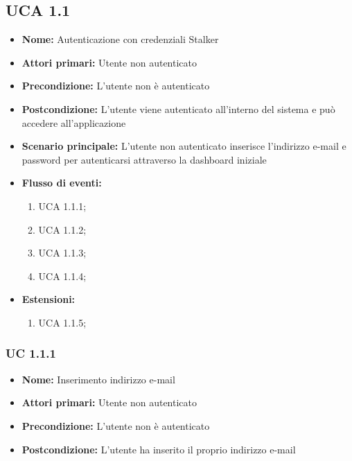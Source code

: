 \documentclass[a4paper, oneside, dvipsnames, table]{article} %
\begin{document}
\subsection{UCA 1.1}%
\begin{itemize}
\item \textbf{Nome:} Autenticazione con credenziali Stalker
\item \textbf{Attori primari:} Utente non autenticato
\item \textbf{Precondizione:} L’utente non è autenticato
\item \textbf{Postcondizione:} L’utente viene autenticato all’interno del sistema e può accedere all'applicazione
\item \textbf{Scenario principale:} L’utente non autenticato inserisce l’indirizzo e-mail e password per autenticarsi attraverso la dashboard iniziale%
\item \textbf{Flusso di eventi:} %
  \begin{enumerate}
        \item UCA 1.1.1;
        \item UCA 1.1.2;
        \item UCA 1.1.3;
        \item UCA 1.1.4;
    \end{enumerate}
\item \textbf{Estensioni:}
	\begin{enumerate}
		\item UCA 1.1.5;
	\end{enumerate}
\end{itemize}

\subsubsection{UC 1.1.1}%
\begin{itemize}
\item \textbf{Nome:} Inserimento indirizzo e-mail
\item \textbf{Attori primari:}  Utente non autenticato
\item \textbf{Precondizione:}  L’utente non è autenticato
\item \textbf{Postcondizione:}  L’utente ha inserito il proprio indirizzo e-mail
\end{itemize}
\end{document}
